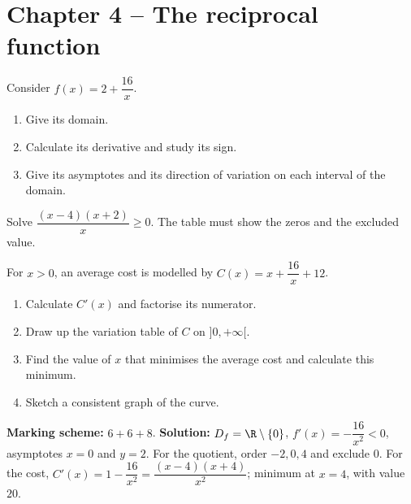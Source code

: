 \section*{Chapter 4 -- The reciprocal function}
\begin{exercise}
Consider $f(x)=2+\dfrac{16}x$.
\begin{enumerate}
\item Give its domain.
\item Calculate its derivative and study its sign.
\item Give its asymptotes and its direction of variation on each interval of the domain.
\end{enumerate}
\end{exercise}
\begin{exercise}
Solve $\dfrac{(x-4)(x+2)}x\geq0$. The table must show the zeros and the excluded value.
\end{exercise}
\begin{exercise}
For $x>0$, an average cost is modelled by $C(x)=x+\dfrac{16}x+12$.
\begin{enumerate}
\item Calculate $C'(x)$ and factorise its numerator.
\item Draw up the variation table of $C$ on $]0,+\infty[$.
\item Find the value of $x$ that minimises the average cost and calculate this minimum.
\item Sketch a consistent graph of the curve.
\end{enumerate}
\end{exercise}
\begin{solution}\textbf{Marking scheme:} $6+6+8$. \textbf{Solution:} $D_f=\R\setminus\{0\}$, $f'(x)=-\dfrac{16}{x^2}<0$, asymptotes $x=0$ and $y=2$. For the quotient, order $-2,0,4$ and exclude $0$. For the cost, $C'(x)=1-\dfrac{16}{x^2}=\dfrac{(x-4)(x+4)}{x^2}$; minimum at $x=4$, with value $20$.\end{solution}

